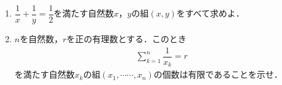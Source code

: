 \documentclass[../../main.tex]{subfiles}
\begin{document}
\begin{enumerate}
  \item $\displaystyle \dfrac{1}{x}+\dfrac{1}{y}=\dfrac{1}{2}$を満たす自然数$x$，$y$の組$(x,y)$をすべて求めよ．
  \item $n$を自然数，$r$を正の有理数とする．このとき
    \begin{align}
      \sum_{k=1}^n\dfrac{1}{x_k}=r
    \end{align}
    を満たす自然数$x_k$の組$(x_1,\cdots\cdots,x_n)$の個数は有限であることを示せ．
\end{enumerate}
\end{document}
